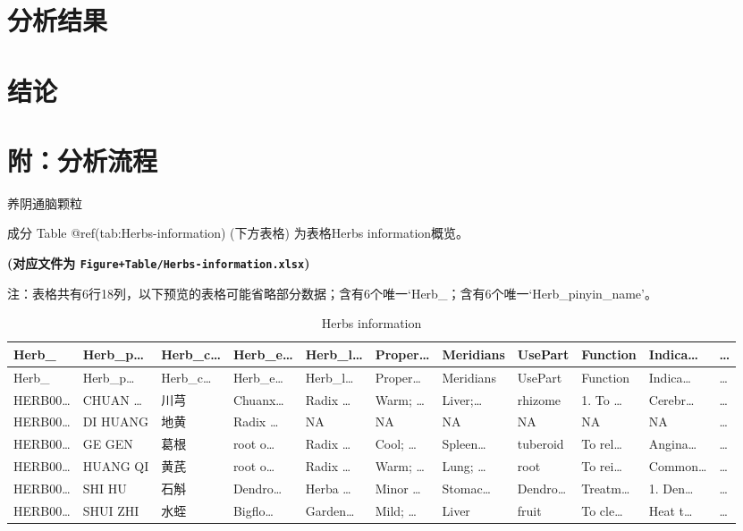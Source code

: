 \documentclass[
  ignorenonframetext,
]{beamer}
\begin{document}
\hypertarget{results}{%
\section{分析结果}\label{results}}

\hypertarget{dis}{%
\section{结论}\label{dis}}

\hypertarget{workflow}{%
\section{附：分析流程}\label{workflow}}

\begin{frame}[fragile]{养阴通脑颗粒}
\protect\hypertarget{ux517bux9634ux901aux8111ux9897ux7c92}{}
\begin{block}{成分}
\protect\hypertarget{ux6210ux5206}{}
Table @ref(tab:Herbs-information) (下方表格) 为表格Herbs
information概览。

\textbf{(对应文件为 \texttt{Figure+Table/Herbs-information.xlsx})}

\begin{center}\begin{tcolorbox}[colback=gray!10, colframe=gray!50, width=0.9\linewidth, arc=1mm, boxrule=0.5pt]注：表格共有6行18列，以下预览的表格可能省略部分数据；含有6个唯一`Herb\_；含有6个唯一`Herb\_pinyin\_name'。
\end{tcolorbox}
\end{center}

\begin{longtable}[]{@{}lllllllllll@{}}
\caption{Herbs information}\tabularnewline
\toprule
Herb\_ & Herb\_p\ldots{} & Herb\_c\ldots{} & Herb\_e\ldots{} &
Herb\_l\ldots{} & Proper\ldots{} & Meridians & UsePart & Function &
Indica\ldots{} & \ldots{}\tabularnewline
\midrule
\endfirsthead
\toprule
Herb\_ & Herb\_p\ldots{} & Herb\_c\ldots{} & Herb\_e\ldots{} &
Herb\_l\ldots{} & Proper\ldots{} & Meridians & UsePart & Function &
Indica\ldots{} & \ldots{}\tabularnewline
\midrule
\endhead
HERB00\ldots{} & CHUAN \ldots{} & 川芎 & Chuanx\ldots{} & Radix \ldots{}
& Warm; \ldots{} & Liver;\ldots{} & rhizome & 1. To \ldots{} &
Cerebr\ldots{} & \ldots{}\tabularnewline
HERB00\ldots{} & DI HUANG & 地黄 & Radix \ldots{} & NA & NA & NA & NA &
NA & NA & \ldots{}\tabularnewline
HERB00\ldots{} & GE GEN & 葛根 & root o\ldots{} & Radix \ldots{} & Cool;
\ldots{} & Spleen\ldots{} & tuberoid & To rel\ldots{} & Angina\ldots{} &
\ldots{}\tabularnewline
HERB00\ldots{} & HUANG QI & 黄芪 & root o\ldots{} & Radix \ldots{} &
Warm; \ldots{} & Lung; \ldots{} & root & To rei\ldots{} & Common\ldots{}
& \ldots{}\tabularnewline
HERB00\ldots{} & SHI HU & 石斛 & Dendro\ldots{} & Herba \ldots{} & Minor
\ldots{} & Stomac\ldots{} & Dendro\ldots{} & Treatm\ldots{} & 1.
Den\ldots{} & \ldots{}\tabularnewline
HERB00\ldots{} & SHUI ZHI & 水蛭 & Bigflo\ldots{} & Garden\ldots{} &
Mild; \ldots{} & Liver & fruit & To cle\ldots{} & Heat t\ldots{} &
\ldots{}\tabularnewline
\bottomrule
\end{longtable}


\end{block}
\end{frame}
\end{document}
